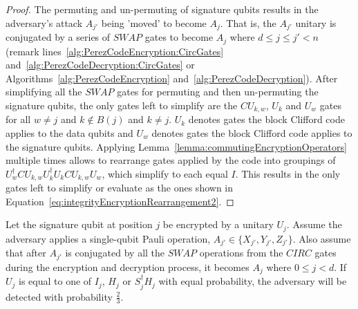 \begin{proof}
The permuting and un-permuting of signature qubits results in the adversary's attack $A_{j'}$ being 'moved' to become $A_j$. That is, the $A_{j'}$ unitary is conjugated by a series of $\mathit{SWAP}$ gates to become $A_{j}$ where $d \leq j \leq j' < n$ (remark lines~\ref{alg:PerezCodeEncryption:CircGates} and~\ref{alg:PerezCodeDecryption:CircGates} or Algorithms~\ref{alg:PerezCodeEncryption} and~\ref{alg:PerezCodeDecryption}). After simplifying all the $\mathit{SWAP}$ gates for permuting and then un-permuting the signature qubits, the only gates left to simplify are the $\mathit{CU}_{k,w}$, $U_k$ and $U_w$ gates for all $w \neq j$ and $k \notin B(j)$ and $k \neq j$. $U_k$ denotes gates the block Clifford code applies to the data qubits and $U_w$ denotes gates the block Clifford code applies to the signature qubits. Applying Lemma~\ref{lemma:commutingEncryptionOperators} multiple times allows to rearrange gates applied by the code into groupings of  $U_w^{\dagger}\mathit{CU}_{k,w}U_k^{\dagger}U_k\mathit{CU}_{k,w}U_w$, which simplify to each equal $I$. This results in the only gates left to simplify or evaluate as the ones shown in Equation~\eqref{eq:integrityEncryptionRearrangement2}.
\end{proof}
\begin{theorem}
\label{theorem:singleQubitAttackOnSignatureQubit}
Let the signature qubit at position $j$ be encrypted by a unitary $U_j$. Assume the adversary applies a single-qubit Pauli operation, $A_{j'} \in \{X_{j'}, Y_{j'}, Z_{j'}\}$. Also assume that after $A_{j'}$ is conjugated by all the $\mathit{SWAP}$ operations from the $\mathit{CIRC}$ gates during the encryption and decryption process, it becomes $A_j$ where $0 \leq j < d$. If $U_j$ is equal to one of $I_j$, $H_j$ or $S_j^{\dagger}H_j$ with equal probability, the adversary will be detected with probability $\frac{2}{3}$.
\end{theorem}
